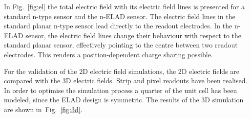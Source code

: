 \documentclass[a4paper,11pt]{article}
\begin{document}
In Fig.~\ref{fig:el} the total electric field with its electric field lines is presented for a standard n-type sensor and the n-ELAD sensor.
The electric field lines in the standard planar n-type sensor lead directly to the readout electrodes. 
In the n-ELAD sensor, the electric field lines change their behaviour with respect to the standard planar sensor, effectively pointing to the centre between two readout electrodes. 
This renders a position-dependent charge sharing possible.

For the validation of the 2D electric field simulations, the 2D electric fields are compared with the 3D electric fields.
Strip and pixel readouts have been realised. 
In order to optimise the simulation process a quarter of the unit cell has been modeled, since the ELAD design is symmetric.
The results of the 3D simulation are shown in~Fig.~\ref{fig:3d}.
\end{document}
